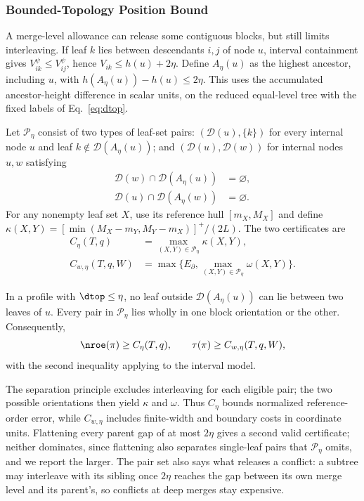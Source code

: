 

\subsubsection{Bounded-Topology Position Bound}
A merge-level allowance can release some contiguous blocks, but still limits interleaving. If leaf $k$ lies between descendants $i,j$ of node $u$, interval containment gives $V_{ik}^{\psi}\le V_{ij}^{\psi}$, hence $V_{ik}\le h(u)+2\eta$. Define $A_\eta(u)$ as the highest ancestor, including $u$, with $h(A_\eta(u))-h(u)\le2\eta$. This uses the accumulated ancestor-height difference in scalar units, on the reduced equal-level tree with the fixed labels of Eq.~\ref{eq:dtop}.

Let $\mathcal{P}_\eta$ consist of two types of leaf-set pairs: $(\mathcal{D}(u),\{k\})$ for every internal node $u$ and leaf $k\notin\mathcal{D}(A_\eta(u))$; and $(\mathcal{D}(u),\mathcal{D}(w))$ for internal nodes $u,w$ satisfying
\begin{equation}\label{eq:separatedpairs}
\begin{aligned}
 \mathcal{D}(w)\cap\mathcal{D}(A_\eta(u))&=\varnothing,\\
 \mathcal{D}(u)\cap\mathcal{D}(A_\eta(w))&=\varnothing.
\end{aligned}
\end{equation}
For any nonempty leaf set $X$, use its reference hull $[m_X,M_X]$ and define $\kappa(X,Y)=[\min(M_X-m_Y,M_Y-m_X)]^+/(2L)$. The two certificates are
\begin{equation}\label{eq:chaindef}
\begin{aligned}
 C_\eta(T,q)&=\max_{(X,Y)\in\mathcal{P}_\eta}\kappa(X,Y),\\
 C_{w,\eta}(T,q,W)&=\max\{E_\partial,\max_{(X,Y)\in\mathcal{P}_\eta}\omega(X,Y)\}.
\end{aligned}
\end{equation}
\begin{theorem}\label{thm:chain}
In a profile with $\dtop\le\eta$, no leaf outside $\mathcal{D}(A_\eta(u))$ can lie between two leaves of $u$. Every pair in $\mathcal{P}_\eta$ lies wholly in one block orientation or the other. Consequently,
\begin{equation}\label{eq:chainbounds}
 \nroe(\pi)\ge C_\eta(T,q),\qquad
 \tau(\pi)\ge C_{w,\eta}(T,q,W),
\end{equation}
with the second inequality applying to the interval model.
\end{theorem}
The separation principle excludes interleaving for each eligible pair; the two possible orientations then yield $\kappa$ and $\omega$. Thus $C_\eta$ bounds normalized reference-order error, while $C_{w,\eta}$ includes finite-width and boundary costs in coordinate units. Flattening every parent gap of at most $2\eta$ gives a second valid certificate; neither dominates, since flattening also separates single-leaf pairs that $\mathcal{P}_\eta$ omits, and we report the larger. The pair set also says what releases a conflict: a subtree may interleave with its sibling once $2\eta$ reaches the gap between its own merge level and its parent's, so conflicts at deep merges stay expensive.

